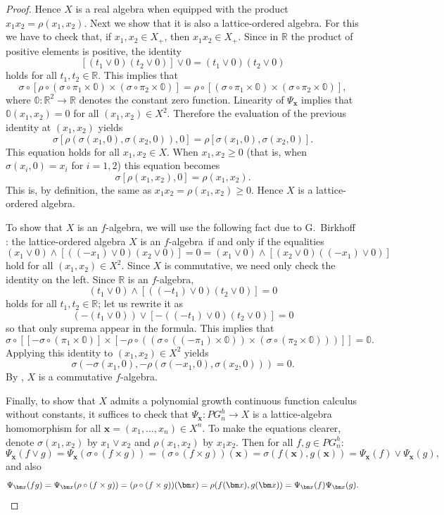 \documentclass{amsart}
\theoremstyle{plain}
\theoremstyle{definition}
\theoremstyle{remark}
\newcommand\R{\ensuremath{\mathbb{R}}}
\newcommand{\zero}{\mathbb{0}}
\newcommand{\falg}{$f\!$-algebra}
\newcommand{\Psx}{\Psi_{\bm x}}
\begin{document}
\begin{proof}
    Hence $X$ is a real algebra when equipped with the product
    $x_1x_2=\rho (x_1,x_2)$. Next we show that it is also a
    lattice-ordered algebra. For this we have to check that, if $x_1,x_2 \in
    X_+$, then $x_1x_2\in X_+$. Since in $\R$ the product of positive
    elements is positive, the identity
    \[
        [(t_1\vee 0)(t_2\vee 0)]\vee 0=(t_1\vee 0)(t_2\vee 0)
    \]
    holds for all $t_1,t_2 \in \R$. This implies that
    \[
    \sigma \circ [\rho \circ (\sigma \circ \pi _1\times \zero)\times
    (\sigma \circ \pi _2\times \zero)]=\rho \circ [(\sigma \circ \pi
    _1\times \zero)\times (\sigma \circ \pi _2\times \zero)],
    \]
    where $\zero \colon \R^{2}\to \R$ denotes the constant zero
    function. Linearity of $\Psx$ implies that $\zero(x_1,x_2)=0$ for
    all $(x_1,x_2)\in X^2$. Therefore the evaluation of the previous
    identity at $(x_1,x_2)$ yields
    \[
        \sigma [\rho (\sigma (x_1,0),\sigma (x_2,0)),0]=\rho [\sigma
        (x_1,0),\sigma (x_2,0)].
    \]
    This equation holds for all $x_1,x_2 \in X$. When $x_1,x_2\ge 0$
    (that is, when $\sigma (x_i,0)=x_i$ for $i=1,2$) this equation
    becomes
    \[
        \sigma [\rho (x_1,x_2),0]=\rho (x_1,x_2).
    \]
    This is, by definition, the same as $x_1x_2=\rho (x_1,x_2)\ge 0$.
    Hence $X$ is a lattice-ordered algebra.

    To show that $X$ is an \falg, we will use the following fact due
    to G.\ Birkhoff \cite[Lemma 3]{birkhoff1967}: the lattice-ordered algebra $X$ is an
    \falg\ if and only if the equalities
    \[
        (x_1\vee 0)\wedge [((-x_1)\vee 0)(x_2\vee 0)]=0=
        (x_1\vee 0)\wedge [(x_2\vee 0)((-x_1)\vee 0)]
    \]
    hold for all $(x_1,x_2)\in X^2$. Since $X$ is commutative, we
    need only check the identity on the left. Since $\R$ is an \falg,
    \[
        (t_1\vee 0)\wedge [((-t_1)\vee 0)(t_2\vee 0)]=0
    \]
    holds for all $t_1,t_2 \in \R$; let us rewrite it as
    \[
        (-(t_1\vee 0))\vee  [-((-t_1)\vee 0)(t_2\vee 0)]=0
    \]
    so that only suprema appear in the formula. This implies that
    \[
        \sigma \circ [[-\sigma \circ (\pi _1\times \zero)]\times [-\rho
        \circ ((\sigma \circ ((-\pi _1)\times \zero))\times (\sigma \circ
        (\pi _2\times \zero)))]]=\zero.
    \]
    Applying this identity to $(x_1,x_2)\in X^2$ yields
    \[
    \sigma (-\sigma (x_1,0),-\rho (\sigma (-x_1,0),\sigma (x_2,0)))=0.
    \]
    By \cite[Lemma 3]{birkhoff1967}, $X$ is a commutative \falg.

    Finally, to show that $X$ admits a polynomial growth
    continuous function calculus without constants, it suffices to check that
    $\Psx\colon PG_n^{h}\to X$ is a lattice-algebra homomorphism for
    all $\bm x=(x_1,\ldots ,x_n) \in X^{n}$. To make the equations
    clearer, denote $\sigma (x_1,x_2)$ by $x_1\vee x_2$ and $\rho
    (x_1,x_2)$ by $x_1x_2$. Then for all $f, g \in PG_n^{h}$:
    \[
    \Psx(f\vee g)=\Psx(\sigma \circ (f\times g))=(\sigma \circ (f\times g))(\bm x)=\sigma (f(\bm
    x),g(\bm x))=\Psx(f)\vee \Psx(g),
    \]
    and also
    \[
    \Psx(fg)=\Psx(\rho \circ (f\times g))=(\rho \circ (f\times g))(\bm
    x)=\rho (f(\bm x),g(\bm x))=\Psx(f)\Psx(g).\qedhere
    \]
\end{proof}
\end{document}

